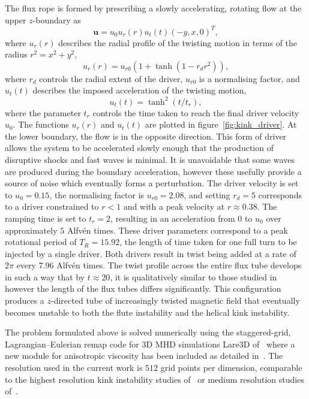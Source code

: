 \documentclass[fleqn,usenatbib]{mnras}
\newcommand{\rs}[2]{{#2}}
\renewcommand{\vec}[1]{{\bm #1}}
\begin{document}
The flux rope is formed by prescribing a slowly accelerating, rotating flow at the upper $z$-boundary as
\begin{equation}
  \label{eq:null_twisting_profile}
  \vec{u} = u_0 u_r(r) u_t(t) (-y, x, 0)^T,
\end{equation}
where $u_r(r)$ describes the radial profile of the twisting motion in terms of the radius $r^2 = x^2 + y^2$,
\begin{equation}
  \label{eq:radial_twisting_function}
  u_r(r) = u_{r0}(1 + \tanh(1 - r_d r^2)),
\end{equation}
where $r_d$ controls the radial extent of the driver, $u_{r0}$ is a normalising factor, and $u_t(t)$ describes the imposed acceleration of the twisting motion,
\begin{equation}
  \label{eq:ramping_up_function}
  u_t(t) = \tanh^2(t/t_r),
\end{equation}
where the parameter $t_r$ controls the time taken to reach the final driver velocity $u_0$. The functions $u_r(r)$ and $u_t(t)$ are plotted in figure~\ref{fig:kink_driver}. At the lower boundary, the flow is in the opposite direction. This form of driver allows the system to be accelerated slowly enough that the production of disruptive shocks and fast waves is minimal. It is unavoidable that some waves are produced during the boundary acceleration, however these usefully provide \rs{one}{a} source of noise which eventually forms a perturbation.
\rs{}{
The driver} velocity is set to $u_0 = 0.15$, the normalising factor is $u_{r0} = 2.08$, and setting $r_d = 5$ corresponds to a driver constrained to $r<1$ and with a peak velocity at $r\approx 0.38$. The ramping time is set to $t_r = 2$, resulting in an acceleration from $0$ to $u_0$ over approximately $5$ Alfv\'en times. These driver parameters correspond to a peak rotational period of $T_R = 15.92$, the length of time taken for one full turn to be injected by a single driver. Both drivers result in twist being added at a rate of $2\pi$ every $7.96$ Alfv\'en times. The twist profile across the entire flux tube develops in such a way that by $t\approx 20$, it is qualitatively similar to those studied in~\citet{quinnEffectAnisotropicViscosity2020,hoodCoronalHeatingMagnetic2009,barefordShockHeatingNumerical2015} however the length of the flux tubes differs significantly. This configuration produces a $z$-directed tube of increasingly twisted magnetic field that eventually becomes unstable to both the flute instability and the helical kink instability.

\rs{}{The problem formulated above is solved numerically using the
  staggered-grid, Lagrangian–Eulerian remap code for 3D MHD
  simulations Lare3D of~\cite{arberStaggeredGridLagrangian2001} where
  a  new module for anisotropic viscosity has been
  included as detailed in~\citet{quinnKelvinHelmholtzInstabilityCollapse2021}.} The resolution used in the
current work is  $512$ grid points per dimension, comparable to the
highest resolution kink instability studies
of~\cite{hoodCoronalHeatingMagnetic2009} or medium resolution studies
of~\cite{barefordShockHeatingNumerical2015}. 
\end{document}
